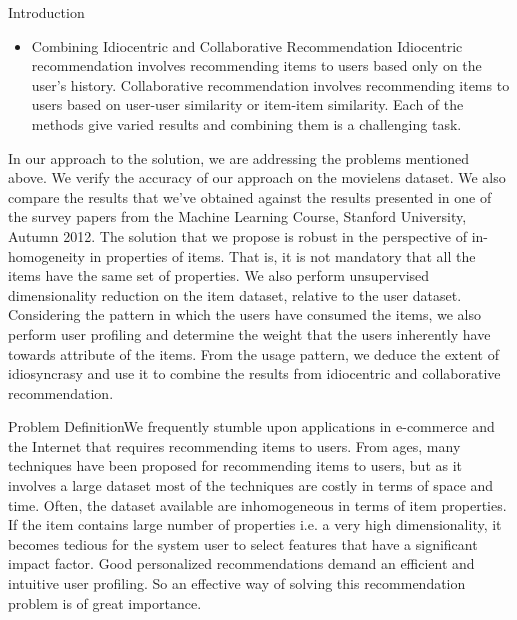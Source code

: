 \documentclass{report}
\begin{document}
\begin{projChapter}{Introduction}
\begin{itemize}
  \item Combining Idiocentric and Collaborative Recommendation
Idiocentric recommendation involves recommending items to users based only on the user's history. Collaborative recommendation involves recommending items to users based on user-user similarity or item-item similarity. Each of the methods give varied results and combining them is a challenging task.
\end{itemize}
In our approach to the solution, we are addressing the problems mentioned above. We verify the accuracy of our approach on the movielens dataset. We also compare the results that we've obtained against the results presented in one of the survey papers from the Machine Learning Course, Stanford University, Autumn 2012. The solution that we propose is robust in the perspective of in-homogeneity in properties of items. That is, it is not mandatory that all the items have the same set of properties. We also perform unsupervised dimensionality reduction on the item dataset, relative to the user dataset. Considering the pattern in which the users have consumed the items, we also perform user profiling and determine the weight that the users inherently have towards attribute of the items. From the usage pattern, we deduce the extent of idiosyncrasy and use it to combine the results from idiocentric and collaborative recommendation.\end{projChapter}

\begin{projChapter}{Problem Definition}We frequently stumble upon applications in e-commerce and the Internet that requires recommending items to users. From ages, many techniques have been proposed for recommending items to users, but as it involves a large dataset most of the techniques are costly in terms of space and time. Often, the dataset available are inhomogeneous in terms of item properties. If the item contains large number of properties i.e. a very high dimensionality, it becomes tedious for the system user to select features that have a significant impact factor. Good personalized recommendations demand an efficient and intuitive user profiling. So an effective way of solving this recommendation problem is of great importance.\end{projChapter}
\end{document}
